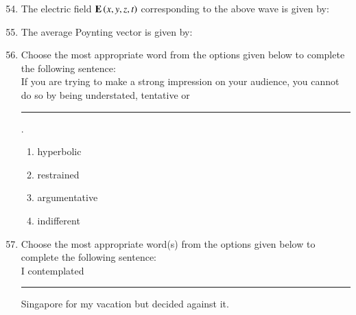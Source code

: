 \documentclass[journal,12pt,onecolumn]{IEEEtran}
\theoremstyle{remark}
\begin{document}
\begin{enumerate}
\setcounter{enumi}{53}
\item The electric field $\mathbf{E}\left(x,y,z,t\right)$ corresponding to the above wave is given by:
\begin{enumerate}
\end{enumerate}
\item  The average Poynting vector is given by:
\begin{enumerate}
\end{enumerate}
\item Choose the most appropriate word from the options given below to complete the following sentence:\\
If you are trying to make a strong impression on your audience, you cannot do so by being understated, tentative or \rule{3cm}{0.15mm}.
\begin{enumerate}
\item hyperbolic
\item restrained
\item argumentative
\item indifferent
\end{enumerate}
\item Choose the most appropriate word(s) from the options given below to complete the following sentence:\\
I contemplated \rule{3cm}{0.15mm} Singapore for my vacation but decided against it.

\end{enumerate}
\end{document}
